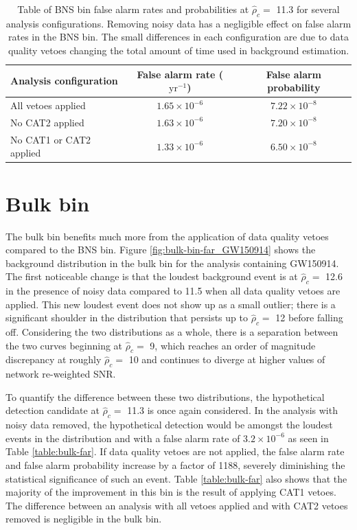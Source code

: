 \begin{table}[!ht]%
  \begin{center}
    \begin{tabular}{lcc}
      \hline
      Analysis configuration & False alarm rate ($\mathrm{yr}^{-1}$) & False alarm probability \\ \hline
      All vetoes applied & $1.65\times10^{-6}$ & $7.22\times10^{-8}$ \\
      No CAT2 applied & $1.63\times10^{-6}$ & $7.20\times10^{-8}$\\
      No CAT1 or CAT2 applied & $1.33\times10^{-6}$ & $6.50\times10^{-8}$\\
      \hline
    \end{tabular}
  \end{center}
  \caption[BNS bin FAR - GW150914 analysis]{Table of BNS bin false alarm rates and probabilities at $\hat{\rho}_{c} =$ 11.3 %
           for several analysis configurations. %
           Removing noisy data has a negligible effect on false alarm rates in the BNS bin. %
           The small differences in each configuration are due to data quality vetoes %
           changing the total amount of time used in background estimation.
           }
  \label{table:bns-far}
\end{table}

\section{Bulk bin}\label{sec:bulk-bin}

The bulk bin benefits much more from the application of data quality vetoes compared to the
BNS bin.
Figure \ref{fig:bulk-bin-far_GW150914} shows the background distribution in the bulk
bin for the analysis containing GW150914.
The
first noticeable change is that the loudest background event is at $\hat{\rho}_{c} =$
12.6 in the presence of noisy data compared to 11.5 when all data quality vetoes
are applied. This new loudest
event does not show up as a small outlier; there is a significant shoulder in the distribution that
persists up to $\hat{\rho}_{c} =$ 12 before falling off. Considering the two distributions as a whole,
there is a separation between the two curves beginning at $\hat{\rho}_{c} =$ 9, which reaches
an order of magnitude discrepancy at roughly $\hat{\rho}_{c} =$ 10 and continues to diverge at higher
values of network re-weighted SNR.

To quantify the difference between these two distributions, the hypothetical detection candidate at
$\hat{\rho}_{c} =$ 11.3 is
once again considered. In the analysis with noisy data removed, the hypothetical detection would be
amongst the loudest events in the distribution and with a false alarm rate of
$3.2\times10^{-6}$ as seen in Table \ref{table:bulk-far}. If data quality vetoes are
not applied,
the false alarm rate and false alarm probability increase by a factor of 1188,
severely diminishing the statistical significance of such an event.
Table \ref{table:bulk-far} also shows that the majority of the improvement in this bin
is the result of applying CAT1 vetoes. The difference between an analysis with all vetoes
applied and with CAT2 vetoes removed is negligible in the bulk bin.

